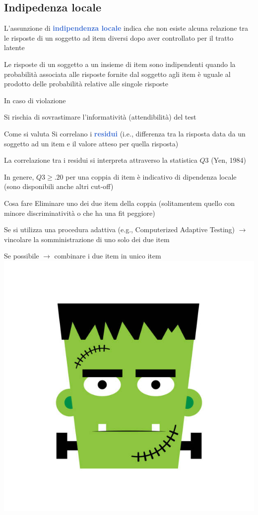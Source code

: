 \documentclass[
  ignorenonframetext,
]{beamer}
\begin{document}
\hypertarget{indipedenza-locale}{%
\subsection{Indipedenza locale}\label{indipedenza-locale}}

\begin{frame}{}
\protect\hypertarget{section-1}{}
L'assunzione di \textcolor{highlight}{\textbf{indipendenza locale}}
indica che non esiste alcuna relazione tra le risposte di un soggetto ad
item diversi dopo aver controllato per il tratto latente

Le risposte di un soggetto a un insieme di item sono indipendenti quando
la probabilità associata alle risposte fornite dal soggetto agli item è
uguale al prodotto delle probabilità relative alle singole risposte

\begin{block}{In caso di violazione}


\vspace{3mm}
Si rischia di sovrastimare l’informatività (attendibilità) del test
\end{block}
\end{frame}

\begin{frame}{Come si valuta}
\protect\hypertarget{come-si-valuta-1}{}
Si correlano i \textcolor{highlight}{\textbf{residui}} (i.e., differenza
tra la risposta data da un soggetto ad un item e il valore atteso per
quella risposta)

La correlazione tra i residui si interpreta attraverso la statistica
\(Q3\) (Yen, 1984)

In genere, \(Q3\geq .20\) per una coppia di item è indicativo di
dipendenza locale (sono disponibili anche altri cut-off)
\end{frame}

\begin{frame}{Cosa fare}
\protect\hypertarget{cosa-fare}{}
Eliminare uno dei due item della coppia (solitamentem quello con minore
discriminatività o che ha una fit peggiore)

Se si utilizza una procedura adattiva (e.g., Computerized Adaptive
Testing) \(\rightarrow\) vincolare la somministrazione di uno solo dei
due item

Se possibile \(\rightarrow\) combinare i due item in unico item
\includegraphics[width=.10\linewidth]{"img/frank.jpg"}
\end{frame}
\end{document}

